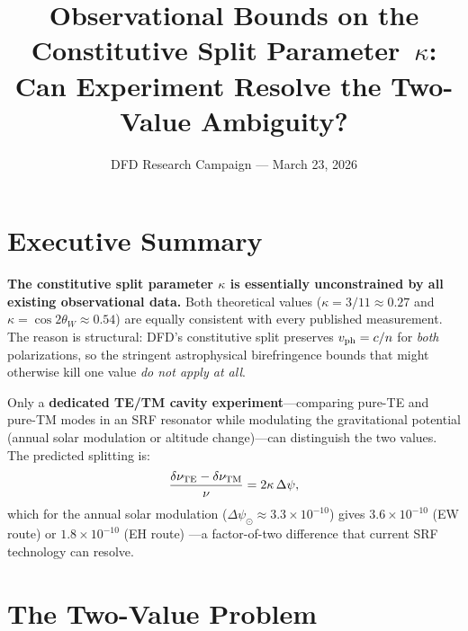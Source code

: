 \documentclass[11pt,a4paper]{article}
\title{Observational Bounds on the Constitutive Split Parameter~$\kappa$:\\
Can Experiment Resolve the Two-Value Ambiguity?}
\author{DFD Research Campaign --- March 23, 2026}
\date{}
\theoremstyle{definition}
\begin{document}
\maketitle

\section{Executive Summary}

\begin{tcolorbox}[colback=red!5!white, colframe=red!60!black,
  title=Principal Finding]
\textbf{The constitutive split parameter $\kappa$ is essentially
unconstrained by all existing observational data.}
Both theoretical values ($\kappa = 3/11 \approx 0.27$ and
$\kappa = \cos 2\theta_W \approx 0.54$) are equally consistent with
every published measurement.  The reason is structural:
DFD's constitutive split preserves $v_{\rm ph} = c/n$ for
\emph{both} polarizations, so the stringent astrophysical
birefringence bounds that might otherwise kill one value
\emph{do not apply at all}.
\end{tcolorbox}

\begin{tcolorbox}[colback=green!5!white, colframe=green!60!black,
  title=Resolution Path]
Only a \textbf{dedicated TE/TM cavity experiment}---comparing
pure-TE and pure-TM modes in an SRF resonator while modulating the
gravitational potential (annual solar modulation or altitude
change)---can distinguish the two values.  The predicted splitting is:
\begin{equation}
\frac{\delta\nu_{\rm TE} - \delta\nu_{\rm TM}}{\nu}
= 2\kappa\,\Delta\psi,
\end{equation}
which for the annual solar modulation
($\Delta\psi_\odot \approx 3.3 \times 10^{-10}$) gives
$3.6 \times 10^{-10}$ (EW route) or $1.8 \times 10^{-10}$ (EH route)
---a factor-of-two difference that current SRF technology can resolve.
\end{tcolorbox}


\section{The Two-Value Problem}
\label{sec:two-values}
\end{document}
